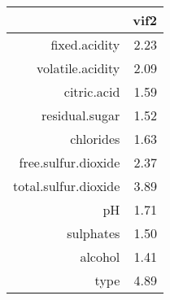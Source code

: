 \begin{tabular}{rr}
  \hline
 & vif2 \\ 
  \hline
fixed.acidity & 2.23 \\ 
  volatile.acidity & 2.09 \\ 
  citric.acid & 1.59 \\ 
  residual.sugar & 1.52 \\ 
  chlorides & 1.63 \\ 
  free.sulfur.dioxide & 2.37 \\ 
  total.sulfur.dioxide & 3.89 \\ 
  pH & 1.71 \\ 
  sulphates & 1.50 \\ 
  alcohol & 1.41 \\ 
  type & 4.89 \\ 
   \hline
\end{tabular}
